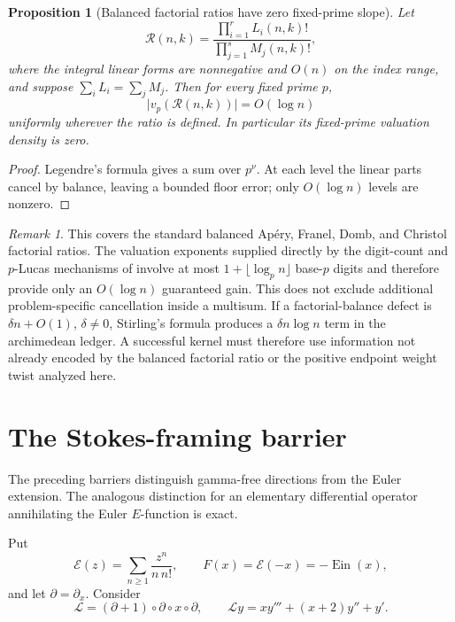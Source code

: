 \documentclass[11pt]{article}
\newtheorem{proposition}[theorem]{Proposition}
\theoremstyle{definition}
\theoremstyle{remark}
\newtheorem{remark}[theorem]{Remark}
\newcommand{\Ein}{\operatorname{Ein}}
\begin{document}
\begin{proposition}[Balanced factorial ratios have zero fixed-prime slope]
\label{prop:balanced-factorial-fixed-p}
Let
\[
 \mathcal R(n,k)=
 \frac{\prod_{i=1}^rL_i(n,k)!}{\prod_{j=1}^sM_j(n,k)!},
\]
where the integral linear forms are nonnegative and \(O(n)\) on the index
range, and suppose \(\sum_iL_i=\sum_jM_j\).  Then for every fixed prime
\(p\),
\[
 \lvert v_p(\mathcal R(n,k))\rvert=O(\log n)
\]
uniformly wherever the ratio is defined.  In particular its fixed-prime
valuation density is zero.
\end{proposition}

\begin{proof}
Legendre's formula gives a sum over \(p^\nu\).  At each level the linear
parts cancel by balance, leaving a bounded floor error; only
\(O(\log n)\) levels are nonzero.
\end{proof}

\begin{remark}
This covers the standard balanced Ap\'ery, Franel, Domb, and Christol
factorial ratios.  The valuation exponents supplied directly by the
digit-count and \(p\)-Lucas mechanisms of \cite{Delaygue2018} involve at
most \(1+\lfloor\log_p n\rfloor\) base-\(p\) digits and therefore provide
only an \(O(\log n)\) guaranteed gain.  This does not exclude additional
problem-specific cancellation inside a multisum.  If a factorial-balance
defect is \(\delta n+O(1)\), \(\delta\ne0\), Stirling's formula produces a
\(\delta n\log n\) term in the archimedean ledger.  A successful kernel
must therefore use information not already encoded by the balanced
factorial ratio or the positive endpoint weight twist analyzed here.
\end{remark}

\section{The Stokes-framing barrier}
\label{sec:stokes-framing}

The preceding barriers distinguish gamma-free directions from the Euler
extension.  The analogous distinction for an elementary differential
operator annihilating the Euler \(E\)-function is exact.

Put
\[
 \mathscr E(z)=\sum_{n\ge1}\frac{z^n}{n\,n!},
 \qquad F(x)=\mathscr E(-x)=-\Ein(x),
\]
and let \(\partial=\partial_x\).  Consider
\begin{equation}\label{eq:euler-E-operator}
 \mathcal L=(\partial+1)\circ\partial\circ x\circ\partial,
 \qquad
 \mathcal Ly=xy'''+(x+2)y''+y'.
\end{equation}
\end{document}
